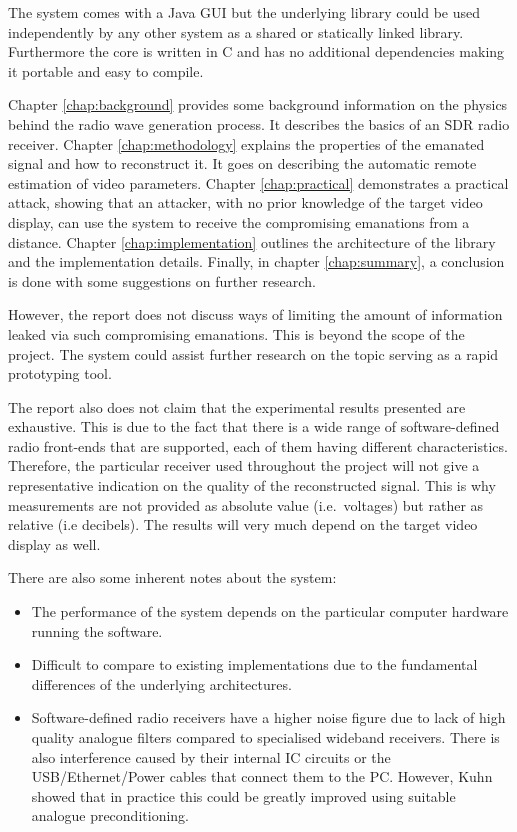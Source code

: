 \documentclass[a4paper,12pt,twoside,openright]{report}
\begin{document}
The system comes with a Java GUI but the underlying library could be used independently by any other system as a shared or statically linked library. Furthermore the core is written in C and has no additional dependencies making it portable and easy to compile.

Chapter \ref{chap:background} provides some background information on the physics behind the radio wave generation process. It describes the basics of an SDR radio receiver. Chapter \ref{chap:methodology} explains the properties of the emanated signal and how to reconstruct it. It goes on describing the automatic remote estimation of video parameters. Chapter \ref{chap:practical} demonstrates a practical attack, showing that an attacker, with no prior knowledge of the target video display, can use the system to receive the compromising emanations from a distance. Chapter \ref{chap:implementation} outlines the architecture of the library and the implementation details. Finally, in chapter \ref{chap:summary}, a conclusion is done with some suggestions on further research.

However, the report does not discuss ways of limiting the amount of information leaked via such compromising emanations. This is beyond the scope of the project. The system could assist further research on the topic serving as a rapid prototyping tool.

The report also does not claim that the experimental results presented are exhaustive. This is due to the fact that there is a wide range of software-defined radio front-ends that are supported, each of them having different characteristics. Therefore, the particular receiver used throughout the project will not give a representative indication on the quality of the reconstructed signal. This is why measurements are not provided as absolute value (i.e.\  voltages) but rather as relative (i.e decibels). The results will very much depend on the target video display as well.

There are also some inherent notes about the system:
\begin{itemize}

  \item The performance of the system depends on the particular computer hardware running the software. 
  \item Difficult to compare to existing implementations due to the fundamental differences of the underlying architectures.
  \item Software-defined radio receivers have a higher noise figure due to lack of high quality analogue filters compared to specialised wideband receivers. There is also interference caused by their internal IC circuits or the USB/Ethernet/Power cables that connect them to the PC. However, Kuhn showed that in practice this could be greatly improved using suitable analogue preconditioning.
  
\end{itemize}
\end{document}
